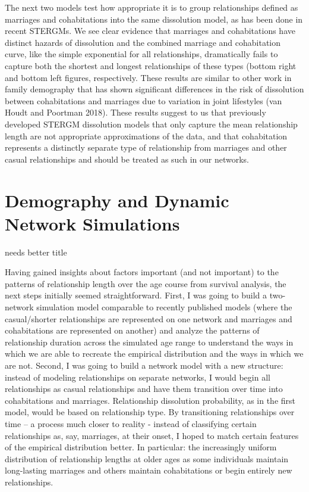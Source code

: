 \documentclass [11pt, proquest] {uwthesis}[2015/03/03]
\begin{document}
The next two models test how appropriate it is to group relationships
defined as marriages and cohabitations into the same dissolution model,
as has been done in recent STERGMs. We see clear evidence that marriages
and cohabitations have distinct hazards of dissolution and the combined
marriage and cohabitation curve, like the simple exponential for all
relationships, dramatically fails to capture both the shortest and
longest relationships of these types (bottom right and bottom left
figures, respectively. These results are similar to other work in family
demography that has shown significant differences in the risk of
dissolution between cohabitations and marriages due to variation in
joint lifestyles (van Houdt and Poortman 2018). These results suggest to
us that previously developed STERGM dissolution models that only capture
the mean relationship length are not appropriate approximations of the
data, and that cohabitation represents a distinctly separate type of
relationship from marriages and other casual relationships and should be
treated as such in our networks.

\chapter{Demography and Dynamic Network Simulations}\label{nets}

needs better title

Having gained insights about factors important (and not important) to
the patterns of relationship length over the age course from survival
analysis, the next steps initially seemed straightforward. First, I was
going to build a two-network simulation model comparable to recently
published models (where the casual/shorter relationships are represented
on one network and marriages and cohabitations are represented on
another) and analyze the patterns of relationship duration across the
simulated age range to understand the ways in which we are able to
recreate the empirical distribution and the ways in which we are not.
Second, I was going to build a network model with a new structure:
instead of modeling relationships on separate networks, I would begin
all relationships as casual relationships and have them transition over
time into cohabitations and marriages. Relationship dissolution
probability, as in the first model, would be based on relationship type.
By transitioning relationships over time -- a process much closer to
reality - instead of classifying certain relationships as, say,
marriages, at their onset, I hoped to match certain features of the
empirical distribution better. In particular: the increasingly uniform
distribution of relationship lengths at older ages as some individuals
maintain long-lasting marriages and others maintain cohabitations or
begin entirely new relationships.
\end{document}
